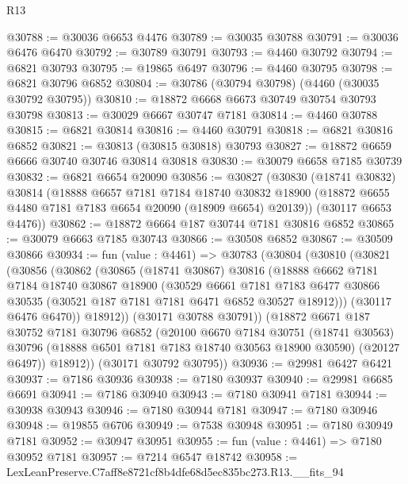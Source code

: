 \begin{lexlean}{R13}
\begin{coremodule}
@30788 := @30036 @6653 @4476
@30789 := @30035 @30788
@30791 := @30036 @6476 @6470
@30792 := @30789 @30791
@30793 := @4460 @30792
@30794 := @6821 @30793
@30795 := @19865 @6497
@30796 := @4460 @30795
@30798 := @6821 @30796 @6852
@30804 := @30786 (@30794 @30798) (@4460 (@30035 @30792 @30795))
@30810 := @18872 @6668 @6673 @30749 @30754 @30793 @30798
@30813 := @30029 @6667 @30747 @7181
@30814 := @4460 @30788
@30815 := @6821 @30814
@30816 := @4460 @30791
@30818 := @6821 @30816 @6852
@30821 := @30813 (@30815 @30818) @30793
@30827 := @18872 @6659 @6666 @30740 @30746 @30814 @30818
@30830 := @30079 @6658 @7185 @30739
@30832 := @6821 @6654 @20090
@30856 := @30827
    (@30830
      (@18741 @30832)
      @30814
      (@18888
        @6657
        @7181
        @7184
        @18740
        @30832
        @18900
        (@18872 @6655 @4480 @7181 @7183 @6654 @20090 (@18909 @6654) @20139))
      (@30117 @6653 @4476))
@30862 := @18872 @6664 @187 @30744 @7181 @30816 @6852
@30865 := @30079 @6663 @7185 @30743
@30866 := @30508 @6852
@30867 := @30509 @30866
@30934 := fun (value : @4461) =>
  @30783
    (@30804
      (@30810
        (@30821
          (@30856
            (@30862
              (@30865
                (@18741 @30867)
                @30816
                (@18888
                  @6662
                  @7181
                  @7184
                  @18740
                  @30867
                  @18900
                  (@30529
                    @6661
                    @7181
                    @7183
                    @6477
                    @30866
                    @30535
                    (@30521 @187 @7181 @7181 @6471 @6852 @30527 @18912)))
                (@30117 @6476 @6470))
              @18912))
          (@30171 @30788 @30791))
        (@18872
          @6671
          @187
          @30752
          @7181
          @30796
          @6852
          (@20100
            @6670
            @7184
            @30751
            (@18741 @30563)
            @30796
            (@18888 @6501 @7181 @7183 @18740 @30563 @18900 @30590)
            (@20127 @6497))
          @18912))
      (@30171 @30792 @30795))
@30936 := @29981 @6427 @6421
@30937 := @7186 @30936
@30938 := @7180 @30937
@30940 := @29981 @6685 @6691
@30941 := @7186 @30940
@30943 := @7180 @30941 @7181
@30944 := @30938 @30943
@30946 := @7180 @30944 @7181
@30947 := @7180 @30946
@30948 := @19855 @6706
@30949 := @7538 @30948
@30951 := @7180 @30949 @7181
@30952 := @30947 @30951
@30955 := fun (value : @4461) => @7180 @30952 @7181
@30957 := @7214 @6547 @18742
@30958 := LexLeanPreserve.C7aff8e8721cf8b4dfe68d5ec835bc273.R13.__fits_94

\end{coremodule}
\end{lexlean}
